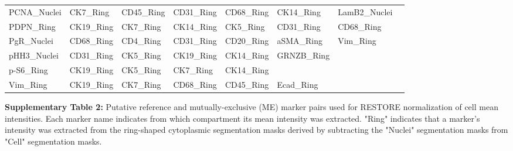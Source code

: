 \documentclass[preprint,review,3p,12pt]{elsarticle}
\begin{document}
\begin{supptable}[p]
{\begin{tabular}{l | l l l l l l l}
PCNA\_Nuclei  & CK7\_Ring     & CD45\_Ring    & CD31\_Ring  & CD68\_Ring    & CK14\_Ring    & LamB2\_Nuclei &               \\
PDPN\_Ring    & CK19\_Ring    & CK7\_Ring     & CK14\_Ring  & CK5\_Ring     & CD31\_Ring    & CD68\_Ring    &               \\
PgR\_Nuclei   & CD68\_Ring    & CD4\_Ring     & CD31\_Ring  & CD20\_Ring    & aSMA\_Ring    & Vim\_Ring     &               \\
pHH3\_Nuclei  & CD31\_Ring    & CK5\_Ring     & CK19\_Ring  & CK14\_Ring    & GRNZB\_Ring   &               &               \\
p-S6\_Ring   & CK19\_Ring    & CK5\_Ring     & CK7\_Ring   & CK14\_Ring    &               &               &               \\
Vim\_Ring     & CK19\_Ring    & CK7\_Ring     & CD68\_Ring  & CD45\_Ring    & Ecad\_Ring    &               &              
\end{tabular}}%
\caption{}
\label{tab:mepairs}
\end{supptable}

\newpage

\noindent
\textbf{Supplementary Table 2:} Putative reference and mutually-exclusive (ME) marker pairs used for RESTORE normalization of cell mean intensities. Each marker name indicates from which compartment its mean intensity was extracted. "Ring" indicates that a marker's intensity was extracted from the ring-shaped cytoplasmic segmentation masks derived by subtracting the "Nuclei" segmentation masks from "Cell" segmentation masks.






\end{document}
